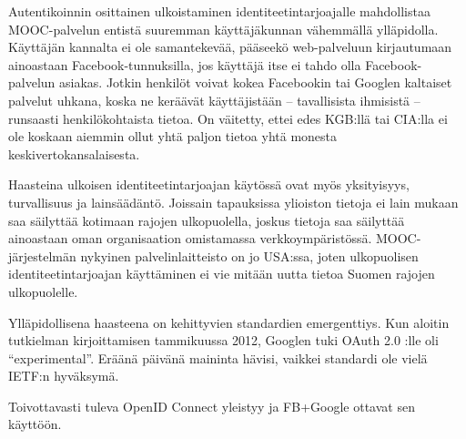 \documentclass[finnish,gradu]{tktltiki}
\begin{document}
  Autentikoinnin osittainen ulkoistaminen identiteetintarjoajalle mahdollistaa MOOC-palvelun entistä suuremman käyttäjäkunnan vähemmällä ylläpidolla. Käyttäjän kannalta ei ole samantekevää, pääseekö web-palveluun kirjautumaan ainoastaan Facebook-tunnuksilla, jos käyttäjä itse ei tahdo olla Facebook-palvelun asiakas. Jotkin henkilöt voivat kokea Facebookin tai Googlen kaltaiset palvelut uhkana, koska ne keräävät käyttäjistään -- tavallisista ihmisistä -- runsaasti henkilökohtaista tietoa. On väitetty, ettei edes KGB:llä tai CIA:lla ei ole koskaan aiemmin ollut yhtä paljon tietoa yhtä monesta keskivertokansalaisesta.

  Haasteina ulkoisen identiteetintarjoajan käytössä ovat myös yksityisyys, turvallisuus ja lainsäädäntö. Joissain tapauksissa ylioiston tietoja ei lain mukaan saa säilyttää kotimaan rajojen ulkopuolella, joskus tietoja saa säilyttää ainoastaan oman organisaation omistamassa verkkoympäristössä. MOOC-järjestelmän nykyinen palvelinlaitteisto on jo USA:ssa, joten ulkopuolisen identiteetintarjoajan käyttäminen ei vie mitään uutta tietoa Suomen rajojen ulkopuolelle.

  Ylläpidollisena haasteena on kehittyvien standardien emergenttiys. Kun aloitin tutkielman kirjoittamisen tammikuussa 2012, Googlen tuki OAuth 2.0 :lle oli ``experimental''. Eräänä päivänä maininta hävisi, vaikkei standardi ole vielä IETF:n hyväksymä. %




  Toivottavasti tuleva OpenID Connect yleistyy ja FB+Google ottavat sen käyttöön.






\newpage




\lastpage
\end{document}

